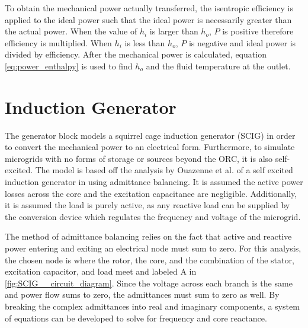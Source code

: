 To obtain the mechanical power actually transferred, the isentropic efficiency is applied to the ideal power such that the ideal power is necessarily greater than the actual power. When the value of $h_i$ is larger than $h_o$, $P$ is positive therefore efficiency is multiplied. When $h_i$ is less than $h_o$, $P$ is negative and ideal power is divided by efficiency. After the mechanical power is calculated, equation \ref{eq:power_enthalpy} is used to find $h_o$ and the fluid temperature at the outlet. 

\section{Induction Generator}
The generator block models a squirrel cage induction generator (SCIG) in order to convert the mechanical power to an electrical form. Furthermore, 
to simulate microgrids with no forms of storage or sources beyond the ORC, it is also self-excited. 
The model is based off the analysis by Ouazenne et al. of a self excited induction generator in \cite{Ouazenne1983} using admittance balancing. It is assumed the active power losses across the core and the excitation capacitance are negligible. Additionally, it is assumed the load is purely active, as any reactive load can be supplied by the conversion device which regulates the frequency and voltage of the microgrid.

The method of admittance balancing relies on the fact that active and reactive power entering and exiting an electrical node must sum to zero. For this analysis, the chosen node is where the rotor, the core, and the combination of the stator, excitation capacitor, and load meet and labeled A in \autoref{fig:SCIG__circuit_diagram}. Since the voltage across each branch is the same and power flow sums to zero, the admittances must sum to zero as well. By breaking the complex admittances into real and imaginary components, a system of equations can be developed to solve for frequency and core reactance. 


